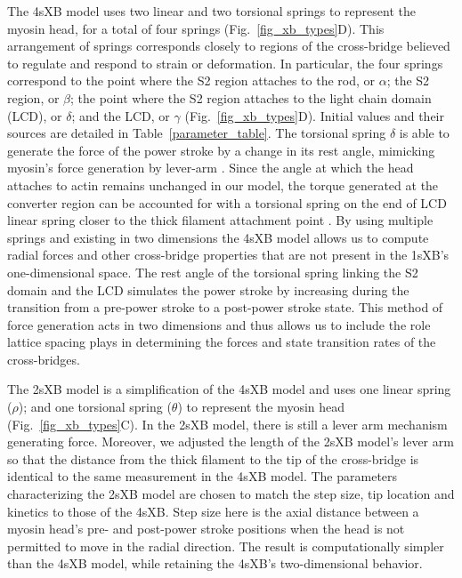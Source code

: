 \documentclass[]{article}
\begin{document}
The 4sXB model uses two linear and two torsional springs to represent the myosin head, for a total of four springs (Fig.~\ref{fig_xb_types}D).
This arrangement of springs corresponds closely to regions of the cross-bridge believed to regulate and respond to strain or deformation. 
In particular, the four springs correspond to the point where the S2 region attaches to the rod, or $\alpha$; the S2 region, or $\beta$; the point where the S2 region attaches to the light chain domain (LCD), or $\delta$; and the LCD, or $\gamma$ (Fig.~\ref{fig_xb_types}D).
Initial values and their sources are detailed in Table~\ref{parameter_table}. 
The torsional spring $\delta$ is able to generate the force of the power stroke by a change in its rest angle, mimicking myosin's force generation by lever-arm \citep{Houdusse2000, Houdusse2001}. 
Since the angle at which the head attaches to actin remains unchanged in our model, the torque generated at the converter region can be accounted for with a torsional spring on the end of LCD linear spring closer to the thick filament attachment point \citep{Houdusse2000}. 
By using multiple springs and existing in two dimensions the 4sXB model allows us to compute radial forces and other cross-bridge properties that are not present in the 1sXB's one-dimensional space. 
The rest angle of the torsional spring linking the S2 domain and the LCD simulates the power stroke by increasing during the transition from a pre-power stroke to a post-power stroke state.
This method of force generation acts in two dimensions and thus allows us to include the role lattice spacing plays in determining the forces and state transition rates of the cross-bridges. 

The 2sXB model is a simplification of the 4sXB model and uses one linear spring ($\rho$); and one torsional spring ($\theta$) to represent the myosin head (Fig.~\ref{fig_xb_types}C). 
In the 2sXB model, there is still a lever arm mechanism generating force.  
Moreover, we adjusted the length of the 2sXB model's lever arm so that the distance from the thick filament to the tip of the cross-bridge is identical to the same measurement in the 4sXB model.
The parameters characterizing the 2sXB model are chosen to match the step size, tip location and kinetics to those of the 4sXB\@. 
Step size here is the axial distance between a myosin head's pre- and post-power stroke positions when the head is not permitted to move in the radial direction. 
The result is computationally simpler than the 4sXB model, while retaining the 4sXB's two-dimensional behavior.
\end{document}
